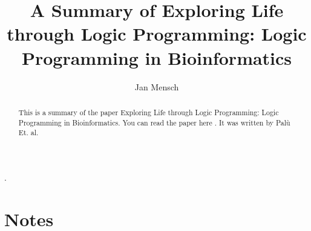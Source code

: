 \documentclass[runningheads]{llncs}
\newcommand{\papertitle}{Exploring Life through Logic Programming: Logic Programming in Bioinformatics}
\newcommand{\authorquote}{Palù Et. al}
\begin{document}
%
\title{A Summary of \papertitle}
%
%
\author{Jan Mensch}
%
%



%
\maketitle              %
%
\begin{abstract}
This is a summary of the paper \papertitle. You can read the paper here \cite{formisanoexploring}.  It was written by \authorquote.

\end{abstract}.


\section{Notes}
\end{document}
